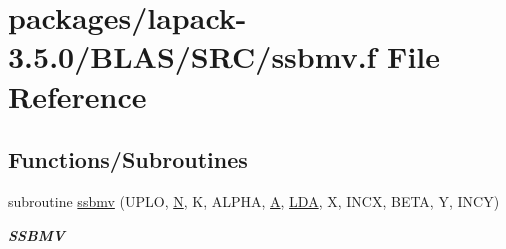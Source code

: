 \hypertarget{lapack-3_85_80_2BLAS_2SRC_2ssbmv_8f}{}\section{packages/lapack-\/3.5.0/\+B\+L\+A\+S/\+S\+R\+C/ssbmv.f File Reference}
\label{lapack-3_85_80_2BLAS_2SRC_2ssbmv_8f}
\subsection*{Functions/\+Subroutines}
\begin{DoxyCompactItemize}
\item 
subroutine \hyperlink{group__single__blas__level2_gad8eb1004e944af8112a6e69f668ac53b}{ssbmv} (U\+P\+L\+O, \hyperlink{polmisc_8c_a0240ac851181b84ac374872dc5434ee4}{N}, K, A\+L\+P\+H\+A, \hyperlink{classA}{A}, \hyperlink{example__user_8c_ae946da542ce0db94dced19b2ecefd1aa}{L\+D\+A}, X, I\+N\+C\+X, B\+E\+T\+A, Y, I\+N\+C\+Y)
\begin{DoxyCompactList}\small\item\em {\bfseries S\+S\+B\+M\+V} \end{DoxyCompactList}\end{DoxyCompactItemize}
